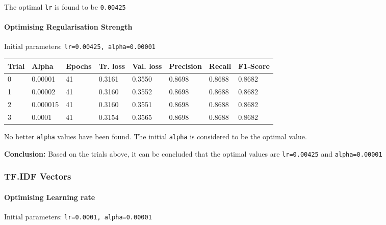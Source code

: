 \documentclass[11pt]{article}
\begin{document}
The optimal \texttt{lr} is found to be \texttt{0.00425}

\hypertarget{optimising-regularisation-strength}{%
\paragraph{Optimising Regularisation
Strength}\label{optimising-regularisation-strength}}

Initial parameters: \texttt{lr=0.00425,\ alpha=0.00001}

\begin{longtable}[]{@{}llllllll@{}}
\toprule
Trial & Alpha & Epochs & Tr. loss & Val. loss & Precision & Recall &
F1-Score\tabularnewline
\midrule
\endhead
0 & 0.00001 & 41 & 0.3161 & 0.3550 & 0.8698 & 0.8688 &
0.8682\tabularnewline
1 & 0.00002 & 41 & 0.3160 & 0.3552 & 0.8698 & 0.8688 &
0.8682\tabularnewline
2 & 0.000015 & 41 & 0.3160 & 0.3551 & 0.8698 & 0.8688 &
0.8682\tabularnewline
3 & 0.0001 & 41 & 0.3154 & 0.3565 & 0.8698 & 0.8688 &
0.8682\tabularnewline
\bottomrule
\end{longtable}

No better \texttt{alpha} values have been found. The initial
\texttt{alpha} is considered to be the optimal value.

\textbf{Conclusion:} Based on the trials above, it can be concluded that
the optimal values are \texttt{lr=0.00425} and \texttt{alpha=0.00001}

\hypertarget{tf.idf-vectors}{%
\subsubsection{TF.IDF Vectors}\label{tf.idf-vectors}}

\hypertarget{optimising-learning-rate-1}{%
\paragraph{Optimising Learning rate}\label{optimising-learning-rate-1}}

Initial parameters: \texttt{lr=0.0001,\ alpha=0.00001}
\end{document}
